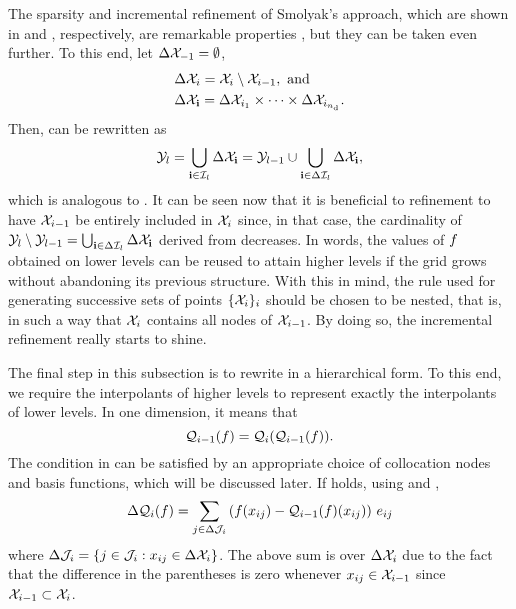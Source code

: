 The sparsity and incremental refinement of Smolyak's approach, which are shown
in  and , respectively, are
remarkable properties \perse, but they can be taken even further. To this end,
let $\Delta\mathcal{X}_{-1} = \emptyset$,
\begin{align*}
  & \Delta\mathcal{X}_i = \mathcal{X}_i \setminus \mathcal{X}_{i - 1}, \text{ and} \\
  & \Delta\mathcal{X}_{\mathbf{i}} = \Delta\mathcal{X}_{i_1} \times \cdots \times \Delta\mathcal{X}_{i_{n_\text{d}}}.
\end{align*}
Then,  can be rewritten as
\begin{equation} \elab{smolyak-grid-incremental}
  \Y_\l = \bigcup_{\vi \in \lindex_\l} \Delta\X_\vi = \Y_{\l - 1} \cup \bigcup_{\vi \in \Delta\lindex_\l} \Delta\X_\vi,
\end{equation}
which is analogous to . It can be seen now that it is
beneficial to refinement to have $\mathcal{X}_{i - 1}$ be entirely included in $\mathcal{X}_i$
since, in that case, the cardinality of $\mathcal{Y}_l \setminus \mathcal{Y}_{l - 1} =
\bigcup_{\mathbf{i} \in \Delta\mathcal{I}_l} \Delta\mathcal{X}_{\mathbf{i}}$ derived from
 decreases. In words, the values of $f$ obtained
on lower levels can be reused to attain higher levels if the grid grows without
abandoning its previous structure. With this in mind, the rule used for
generating successive sets of points $\{ \mathcal{X}_i \}_i$ should be chosen to be
nested, that is, in such a way that $\mathcal{X}_i$ contains all nodes of $\mathcal{X}_{i - 1}$.
By doing so, the incremental refinement really starts to shine.

The final step in this subsection is to rewrite  in a
hierarchical form. To this end, we require the interpolants of higher levels to
represent exactly the interpolants of lower levels. In one dimension, it means
that
\begin{equation} \elab{tensor-exactness}
  \tensor{i - 1}(\f) = \tensor{i}(\tensor{i - 1}(\f)).
\end{equation}
The condition in  can be satisfied by an appropriate
choice of collocation nodes and basis functions, which will be discussed later.
If  holds, using  and
,
\[
  \Delta\mathcal{Q}_{i}(f) = \sum_{j \in \Delta\mathcal{J}_i} \left( f(x_{ij}) - \mathcal{Q}_{i - 1}(f)(x_{ij}) \right) \, e_{ij}
\]
where $\Delta\mathcal{J}_i = \{ j \in \mathcal{J}_i: x_{ij} \in \Delta\mathcal{X}_i \}$. The
above sum is over $\Delta\mathcal{X}_i$ due to the fact that the difference in the
parentheses is zero whenever $x_{ij} \in \mathcal{X}_{i - 1}$ since $\mathcal{X}_{i - 1} \subset
\mathcal{X}_i$.

